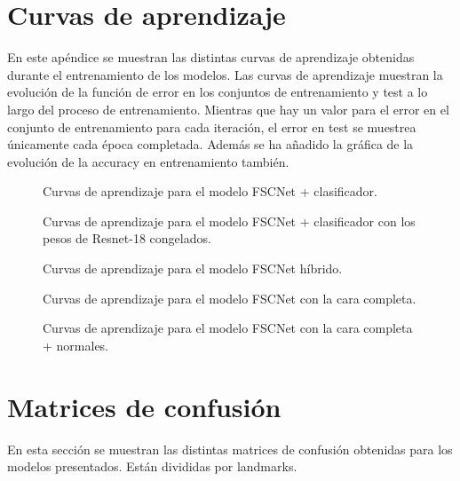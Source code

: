 \begin{appendices}
\chapter{Curvas de aprendizaje} \label{APENDICEB}
En este apéndice se muestran las distintas curvas de aprendizaje obtenidas durante el entrenamiento de los modelos. Las curvas de aprendizaje muestran la evolución de la función de error en los conjuntos de entrenamiento y test a lo largo del proceso de entrenamiento. Mientras que hay un valor para el error en el conjunto de entrenamiento para cada iteración, el error en test se muestrea únicamente cada época completada. Además se ha añadido la gráfica de la evolución de la accuracy en entrenamiento también.

\begin{figure}[h]
\noindent
{}
\caption{Curvas de aprendizaje para el modelo FSCNet + clasificador.}
\label{fig:curvas_clasificador}
\end{figure}

\begin{figure}[h]
\noindent
{}
\caption{Curvas de aprendizaje para el modelo FSCNet + clasificador con los pesos de Resnet-18 congelados.}
\label{fig:curvas_clasificador_freeze}
\end{figure}

\begin{figure}[h]
\noindent
{}
\caption{Curvas de aprendizaje para el modelo FSCNet híbrido.}
\label{fig:curvas_hibrido}
\end{figure}

\begin{figure}[h]
\noindent
{}
\caption{Curvas de aprendizaje para el modelo FSCNet con la cara completa.}
\label{fig:curvas_caracompleta}
\end{figure}

\begin{figure}[h]
\noindent
{}
\caption{Curvas de aprendizaje para el modelo FSCNet con la cara completa + normales.}
\label{fig:curvas_caracompleta_normales}
\end{figure}

\clearpage
\chapter{Matrices de confusión} \label{APENDICEC}
En esta sección se muestran las distintas matrices de confusión obtenidas para los modelos presentados. Están divididas por landmarks.


\end{appendices}
